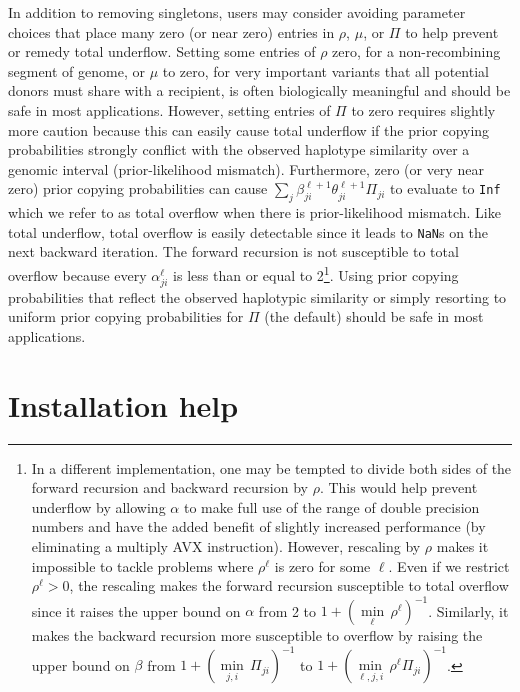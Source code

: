 \documentclass[a4paper]{article}
\begin{document}
In addition to removing singletons, users may consider avoiding parameter choices that place many zero (or near zero) entries in \(\rho\), \(\mu\), or \(\Pi\) to help prevent or remedy total underflow.
Setting some entries of \(\rho\) zero, for a non-recombining segment of genome, or \(\mu\) to zero, for very important variants that all potential donors must share with a recipient, is often biologically meaningful and should be safe in most applications.
However, setting entries of \(\Pi\) to zero requires slightly more caution because this can easily cause total underflow if the prior copying probabilities strongly conflict with the observed haplotype similarity over a genomic interval (prior-likelihood mismatch).
Furthermore, zero (or very near zero) prior copying probabilities can cause \(\underset{j}{\sum} \beta_{ji}^{\ell+1}\theta_{ji}^{\ell+1} \Pi_{ji}\) to evaluate to \texttt{Inf} which we refer to as total overflow when there is prior-likelihood mismatch.
Like total underflow, total overflow is easily detectable since it leads to \texttt{NaN}s on the next backward iteration.
The forward recursion is not susceptible to total overflow because every \(\alpha_{ji}^\ell\) is less than or equal to 2\footnote[2]{
  In a different implementation, one may be tempted to divide both sides of the forward recursion and backward recursion by \(\rho\).
  This would help prevent underflow by allowing \(\alpha\) to make full use of the range of double precision numbers and have the added benefit of slightly increased performance (by eliminating a multiply AVX instruction).
  However, rescaling by \(\rho\) makes it impossible to tackle problems where \(\rho^\ell\) is zero for some \(\ell\).
  Even if we restrict \(\rho^\ell > 0\), the rescaling makes the forward recursion susceptible to total overflow since it raises the upper bound on \(\alpha\) from 2 to \(1 + \left( \underset{\ell}{\min}\,\rho^\ell \right)^{-1}\).
	Similarly, it makes the backward recursion more susceptible to overflow by raising the upper bound on \(\beta\) from \(1 + \left( \underset{j,i}{\min}\,\Pi_{ji} \right)^{-1}\) to \(1 + \left( \underset{\ell,j,i}{\min}\,\rho^\ell \Pi_{ji} \right)^{-1}\).}.
Using prior copying probabilities that reflect the observed haplotypic similarity or simply resorting to uniform prior copying probabilities for \(\Pi\) (the default) should be safe in most applications.



\section{Installation help}
\label{installation-help}
\end{document}
